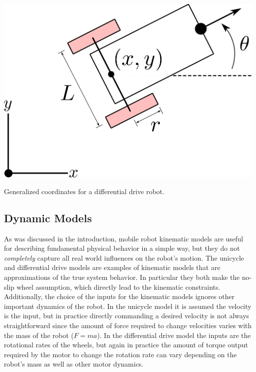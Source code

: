 \begin{marginfigure}
    \centering 
    \includegraphics[width=0.9\linewidth]{tex/figs/ch01_figs/diff_drive.png}
    \caption{Generalized coordinates for a differential drive robot.} 
    \label{fig:dd} 
\end{marginfigure} 


\subsection{Dynamic Models}
As was discussed in the introduction, mobile robot kinematic models are useful for describing fundamental physical behavior in a simple way, but they do not \textit{completely} capture all real world influences on the robot's motion. The unicycle and differential drive models are examples of kinematic models that are approximations of the true system behavior. In particular they both make the no-slip wheel assumption, which directly lead to the kinematic constraints. Additionally, the choice of the inputs for the kinematic models ignores other important dynamics of the robot. In the unicycle model it is assumed the velocity is the input, but in practice directly commanding a desired velocity is not always straightforward since the amount of force required to change velocities varies with the mass of the robot ($F=ma$). In the differential drive model the inputs are the rotational rates of the wheels, but again in practice the amount of torque output required by the motor to change the rotation rate can vary depending on the robot's mass as well as other motor dynamics.

